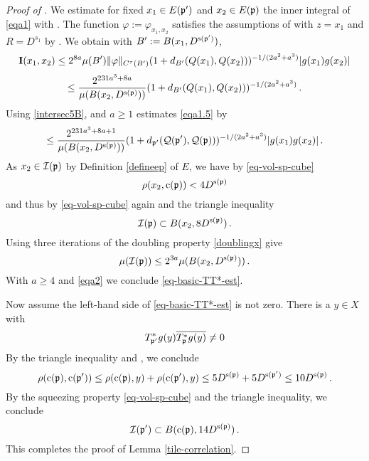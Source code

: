 \begin{proof}[Proof of ]
We estimate for fixed $x_1\in E({\mathfrak p}')$ and
$x_2\in E({\mathfrak p})$ the inner integral of \eqref{eqa1} with
. The function
$\varphi:=\varphi_{x_1,x_2}$ satisfies the assumptions of
 with $z = x_1$ and $R = D^{s_1}$ by .
We obtain with $B':= B(x_1, D^{{\mathrm{s}}({\mathfrak p}')})$,
\begin{equation*}
 {\bf I}(x_1, x_2) \le 2^{8a} \mu(B') \|{\varphi}\|_{C^\tau(B')}
       (1 + d_{B'}({Q}(x_1),{Q}(x_2)))^{-1/(2a^2+a^3)}|g(x_1)g(x_2)|
\end{equation*}
\begin{equation}
\label{eqa1.5}
 \le \frac{2^{231a^3+8a}}
 {\mu(B(x_2, D^{{\mathrm{s}}({\mathfrak p})}))}
       (1 + d_{B'}({Q}(x_1),{Q}(x_2)))^{-1/(2a^2+a^3)}\,.
\end{equation}
Using \eqref{intersec5B},  and $a\ge 1$ estimates \eqref{eqa1.5} by
\begin{equation}\label{eqa2}
 \le \frac{2^{231a^3 + 8a + 1}}
 {\mu(B(x_2, D^{{\mathrm{s}}({\mathfrak p})}))}
       (1+d_{{\mathfrak p}'}({\mathcal{Q}}({\mathfrak p}'), {\mathcal{Q}}({\mathfrak p})))^{-1/(2a^2+a^3)}|g(x_1)g(x_2)|\,.
\end{equation}
As $x_2\in {\mathcal{I}}({\mathfrak p})$ by Definition \eqref{defineep} of $E$, we have by \eqref{eq-vol-sp-cube}
\begin{equation}
    \rho(x_2,{\mathrm{c}}({\mathfrak p})) < 4D^{{\mathrm{s}}({\mathfrak p})}
\end{equation}
and thus by \eqref{eq-vol-sp-cube} again and the triangle inequality
\begin{equation}
    {\mathcal{I}}({\mathfrak p})\subset B(x_2,8D^{{\mathrm{s}}({\mathfrak p})})\, .
\end{equation}
Using three iterations of the doubling property \eqref{doublingx} give
\begin{equation}
    \mu({\mathcal{I}}({\mathfrak p}))\le 2^{3a}\mu(B(x_2,D^{{\mathrm{s}}({\mathfrak p})}))\, .
\end{equation}
With $a\ge 4$ and \eqref{eqa2} we conclude \eqref{eq-basic-TT*-est}.


Now assume the left-hand side of \eqref{eq-basic-TT*-est} is not zero.
There is a $y\in X$ with
\begin{equation}
    T^*_{{\mathfrak p}'}g(y)\overline{T^*_{{\mathfrak p}}g(y)}\neq 0
\end{equation}
By the triangle inequality and , we conclude
\begin{equation}
   \rho({\mathrm{c}}({\mathfrak p}),{\mathrm{c}}({\mathfrak p}'))\le \rho({\mathrm{c}}({\mathfrak p}),y) +\rho({\mathrm{c}}({\mathfrak p}'),y)
   \le 5D^{{\mathrm{s}}({\mathfrak p})}+5D^{{\mathrm{s}}({\mathfrak p}')}\le 10 D^{{\mathrm{s}}({\mathfrak p})}\, .
\end{equation}
By the squeezing property \eqref{eq-vol-sp-cube} and the triangle inequality,
we conclude
\begin{equation}
    {\mathcal{I}}({\mathfrak p}') \subset B({\mathrm{c}}({\mathfrak p}), 14D^{{\mathrm{s}}({\mathfrak p})})\, .
\end{equation}
   This completes the proof of Lemma \ref{tile-correlation}.
\end{proof}




